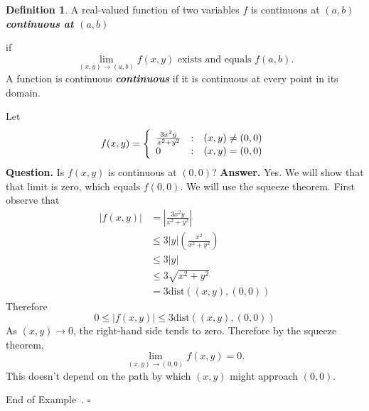 \documentclass[10pt]{article}
\DeclareRobustCommand{\demph}[1]{%
  \ifmmode
  {\color{Blue}#1}%
  \else
  {\color{Blue}\bfseries\slshape #1}%
  \fi
}
\theoremstyle{definition}
\newtheorem{definition}[theorem]{Definition}
\newtheorem{example}[theorem]{Example}
\renewenvironment{example}
{\begin{oldexample}}
  {\par\smallskip\hfill   End of Example~\theexample. $\square$    \par\end{oldexample}}
\newcommand{\vt}{\vskip 5mm} %
\newcommand{\Fl}{\vt\noindent\textbf} %
\newcommand{\1}[1]{\textbf{1}_{\left[#1\right]}} %
\begin{document}
\begin{definition}
  A real-valued function of two variables $f$ is \demph{continuous at $(a,b)$}
  if
  \begin{equation*}
    \lim_{(x,y) \to (a,b)}f(x,y)\text{ exists and equals }f(a,b).
  \end{equation*}
  A function is \demph{continuous} if it is continuous at every point in its
  domain.
\end{definition}


\begin{example}
  \label{ex:later}
  Let
  \begin{equation*}
    f(x,y) = \left\{ \begin{array}{l@{\quad:\quad}l} \frac{3x^{2}y}{x^{2}+y^{2}} & (x,y)\neq (0,0)\\0 & (x,y)=(0,0)\end{array}\right.
  \end{equation*}
  \Fl{Question.} Is $f(x,y)$ is continuous at $(0,0)$?
  \Fl{Answer.} Yes. We will show that that limit is zero, which equals $f(0,0)$. We will use the squeeze theorem. First observe that
  \begin{align*}
    |f(x,y)|
    &= \left| \frac{3x^{2}y}{x^{2}+y^{2}} \right|\\
    &\leq  3|y| \left( \frac{x^{2}}{x^{2}+y^{2}} \right)\\ 
    &\leq 3|y|\\
    &\leq 3 \sqrt{x^{2}+y^{2}}\\
    &= 3 \text{dist}((x,y),(0,0))
  \end{align*}
  Therefore
  \begin{equation*}
    0 \leq |f(x,y)| \leq  3 \text{dist}((x,y),(0,0))
  \end{equation*}
  As $(x,y)\to 0$, the right-hand side tends to zero. Therefore by the squeeze
  theorem,
  \begin{equation*}
    \lim_{(x,y)\to (0,0)} f(x,y) = 0.
  \end{equation*}
  This doesn't depend on the path by which $(x,y)$ might approach $(0,0)$.
\end{example}



\end{document}
